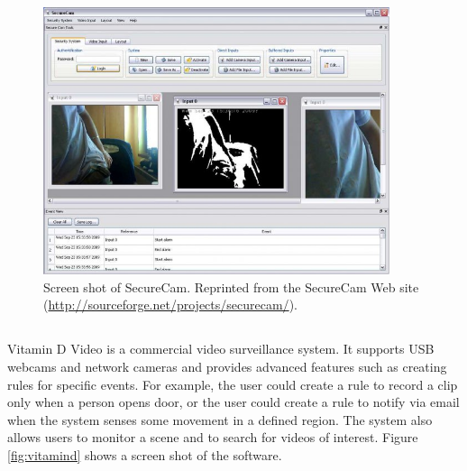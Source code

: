 \begin{figure}[t]
  \begin{center}
    \includegraphics[width=4in]{figures/securecam.jpg}
    \caption[Screen shot of SecureCam.]{\small Screen shot of
      SecureCam. Reprinted from the SecureCam Web site
      (\url{http://sourceforge.net/projects/securecam/}).}
    \label{fig:securecam}
  \end{center}
\end{figure}

\DIFdelbegin \subsection{}

\addtocounter{subsection}{-1}%

\DIFdelend Vitamin D Video  is a commercial video
surveillance system. It supports USB webcams and network cameras and
provides advanced features such as creating rules for specific events.
For example, the user could create a rule to record a clip only when a
person opens \DIFdelbegin {}\DIFdelend \DIFaddbegin {}\DIFaddend door, or the user could create a rule to notify via
email when the system senses some movement in a defined region. The
system also allows users to monitor a scene and to search for videos
of interest.  Figure \ref{fig:vitamind} shows a screen shot of the
software.

